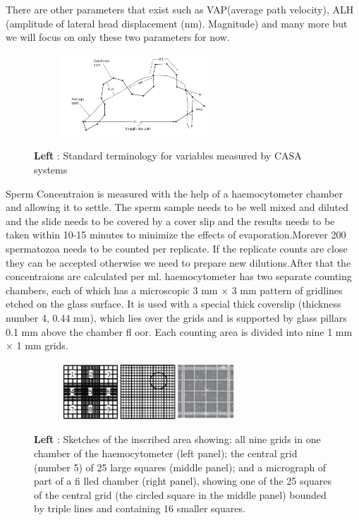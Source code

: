 \documentclass{article}
\begin{document}
There are other parameters that exist such as VAP(average path velocity),  ALH (amplitude of lateral head displacement (nm). Magnitude) and many more but we will focus on only these two parameters for now.
\begin{figure}[H]
  \centering
  \begin{subfigure}{5.5cm}
    \centering\includegraphics[width=5.5cm]{CASA.png}
  \end{subfigure}
  \caption{\textbf{Left} : Standard terminology for variables measured by CASA systems}
 \label{fig:CASA}
\end{figure}

Sperm Concentraion is measured with the help of a haemocytometer chamber and allowing it to settle.
The sperm sample needs to be well mixed and diluted and the slide needs to be covered by a cover slip and the results needs to be taken within 10-15 minutes to minimize the effects of evaporation.Morever 200 spermatozoa needs to be counted per replicate.
If the replicate counts are close they can be accepted otherwise we need to prepare new dilutions.After that the concentraions are calculated per ml.
haemocytometer has two separate counting chambers, 
each of which has a microscopic 3 mm × 3 mm pattern of 
gridlines etched on the glass surface. 
It is used with a special thick coverslip (thickness number 4, 0.44 mm), which lies over the grids and is supported by glass pillars 0.1 mm above the chamber fl oor. 
Each counting area is divided into nine 1 mm × 1 mm grids.

\begin{figure}[H]
  \centering
  \begin{subfigure}{5.5cm}
    \centering\includegraphics[width=6.5cm]{grid.png}
  \end{subfigure}
  \caption{\textbf{Left} : Sketches of the inscribed area showing: all nine grids in one chamber of the haemocytometer (left panel); the central grid (number 5) of 25 large squares (middle panel); and a micrograph of part of a fi lled chamber (right panel), showing one of the 25 squares of the central grid (the circled square in the middle panel) bounded by triple lines and containing 16 smaller squares.}
 \label{fig:grid}
\end{figure}
\end{document}
